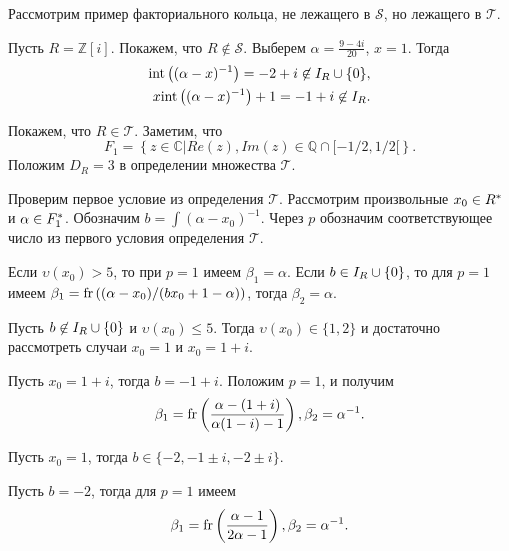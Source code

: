 \documentclass[_00_dissertation.tex]{subfiles}
\begin{document}
Рассмотрим пример факториального кольца, не лежащего в $\mathcal{S}$, но лежащего в $\mathcal{T}$.

\begin{example}\label{example:Z[i]}
    Пусть $R = \mathbb{Z}[i]$.
    Покажем, что $R \not\in \mathcal{S}$.
    Выберем $\alpha = \frac{9 - 4i}{20}$, $x = 1$.
    Тогда
    \begin{equation*}
        \begin{split}
            \textrm{int}\left((\alpha-x)^{-1}\right) = -2+i \not\in I_{R} \cup \{0\},\\
            x \textrm{int}\left((\alpha-x)^{-1}\right) + 1 = -1 + i \not\in I_{R}.
        \end{split}
    \end{equation*}

    Покажем, что $R \in \mathcal{T}$.
    Заметим, что
    \begin{equation*}
        F_1 = \left\{
            z \in \mathbb{C} | Re(z), Im(z) \in \mathbb{Q} \cap [-1/2,1/2[
        \right\}.
    \end{equation*}
    Положим $D_R = 3$ в определении множества $\mathcal{T}$.

    Проверим первое условие из определения $\mathcal{T}$.
    Рассмотрим произвольные $x_0 \in R^{*}$ и $\alpha \in F_1^{*}$.
    Обозначим $b = \int{(\alpha - x_0)^{-1}}$.
    Через $p$ обозначим соответствующее число из первого условия определения $\mathcal{T}$.
    
    Если $\upsilon(x_0) > 5$, то при $p = 1$ имеем $\beta_1 = \alpha$.
    Если $b \in I_{R} \cup \{0\}$, то для $p = 1$ имеем $\beta_1 = \textrm{fr}\left((\alpha - x_0)/(b x_0 + 1 - \alpha)\right)$, тогда $\beta_2 = \alpha$.

    Пусть $b \not\in I_{R} \cup \{0\}$ и $\upsilon(x_0) \le 5$.
    Тогда $\upsilon(x_0) \in \{1, 2\}$ и достаточно рассмотреть случаи $x_0 = 1$ и $x_0=1+i$.

    Пусть $x_0 = 1 + i$, тогда $b = -1 + i$.
    Положим $p = 1$, и получим
    \begin{equation*}
        \beta_1 = \textrm{fr}\left(\frac{\alpha - (1 + i)}{\alpha(1-i)-1}\right), \beta_2 = \alpha^{-1}.
    \end{equation*}

    Пусть $x_0 = 1$, тогда $b \in \{-2, -1 \pm i, -2 \pm i\}$.

    Пусть $b = -2$, тогда для $p = 1$ имеем
    \begin{equation*}
        \beta_1 = \textrm{fr}\left(\frac{\alpha - 1}{2\alpha - 1}\right), \beta_2 = \alpha^{-1}.
    \end{equation*}


\end{example}
\end{document}

